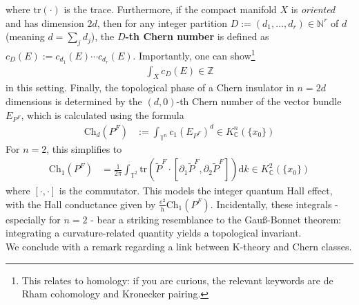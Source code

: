 where $\mathrm{tr}(\cdot)$ is the trace.
Furthermore, if the compact manifold $X$ is \textit{oriented} and has dimension $2d$, then for any integer partition $D := (d_{1},\ldots,d_{r}) \in \mathbb{N}^{r}$ of $d$ (meaning $d = \sum_{j}d_{j}$), the \textbf{$D$-th Chern number} is defined as $c_{D}(E) := c_{d_{1}}(E) \cdots c_{d_{r}}(E)$.
Importantly, one can show\footnote{This relates to homology: if you are curious, the relevant keywords are de Rham cohomology and Kronecker pairing.}
\begin{align*}
  \int_{X}
  c_{D}(E)
  \in
  \mathbb{Z}
\end{align*}
in this setting.
Finally, the topological phase of a Chern insulator in $n = 2d$ dimensions is determined by the $(d,0)$-th Chern number of the vector bundle $E_{P^{F}}$, which is calculated using the formula
\begin{align*}
  \mathrm{Ch}_{d}(P^{F})
  &:=
  \int_{\mathbb{T}^{n}}
  c_{1}(E_{P^{F}})^{d}
  \in
  K_{\mathbb{C}}^{n}(\lbrace x_{0} \rbrace)
\end{align*}
For $n = 2$, this simplifies to
\begin{align*}
  \mathrm{Ch}_{1}(P^{F})
  &=
  \frac{\mathrm{i}}{2\pi}
  \int_{\mathbb{T}^{2}}
  \mathrm{tr}
  \left(
    \tilde{P}^{F}
    \cdot
    [\partial_{1}\tilde{P}^{F},\partial_{2}\tilde{P}^{F}]
  \right)
  \mathrm{d}k
  \in
  K_{\mathbb{C}}^{2}(\lbrace x_{0} \rbrace)
\end{align*}
where $[\cdot,\cdot]$ is the commutator.
This models the integer quantum Hall effect, with the Hall conductance given by $\frac{e^{2}}{h}\mathrm{Ch}_{1}(P^{F})$.
Incidentally, these integrals - especially for $n = 2$ - bear a striking resemblance to the Gau{\ss}-Bonnet theorem: integrating a curvature-related quantity yields a topological invariant.
\\
We conclude with a remark regarding a link between K-theory and Chern classes.
\\
